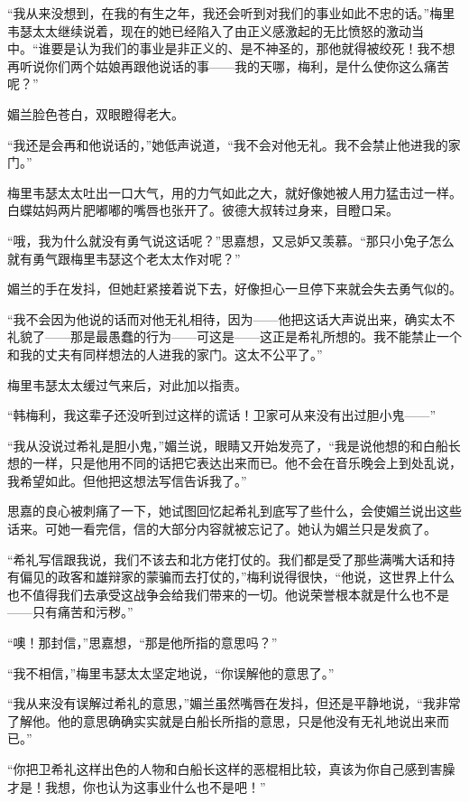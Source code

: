 \par “我从来没想到，在我的有生之年，我还会听到对我们的事业如此不忠的话。”梅里韦瑟太太继续说着，现在的她已经陷入了由正义感激起的无比愤怒的激动当中。“谁要是认为我们的事业是非正义的、是不神圣的，那他就得被绞死！我不想再听说你们两个姑娘再跟他说话的事——我的天哪，梅利，是什么使你这么痛苦呢？”
\par 媚兰脸色苍白，双眼瞪得老大。
\par “我还是会再和他说话的，”她低声说道，“我不会对他无礼。我不会禁止他进我的家门。”
\par 梅里韦瑟太太吐出一口大气，用的力气如此之大，就好像她被人用力猛击过一样。白蝶姑妈两片肥嘟嘟的嘴唇也张开了。彼德大叔转过身来，目瞪口呆。
\par “哦，我为什么就没有勇气说这话呢？”思嘉想，又忌妒又羡慕。“那只小兔子怎么就有勇气跟梅里韦瑟这个老太太作对呢？”
\par 媚兰的手在发抖，但她赶紧接着说下去，好像担心一旦停下来就会失去勇气似的。
\par “我不会因为他说的话而对他无礼相待，因为——他把这话大声说出来，确实太不礼貌了——那是最愚蠢的行为——可这是——这正是希礼所想的。我不能禁止一个和我的丈夫有同样想法的人进我的家门。这太不公平了。”
\par 梅里韦瑟太太缓过气来后，对此加以指责。
\par “韩梅利，我这辈子还没听到过这样的谎话！卫家可从来没有出过胆小鬼——”
\par “我从没说过希礼是胆小鬼，”媚兰说，眼睛又开始发亮了，“我是说他想的和白船长想的一样，只是他用不同的话把它表达出来而已。他不会在音乐晚会上到处乱说，我希望如此。但他把这想法写信告诉我了。”
\par 思嘉的良心被刺痛了一下，她试图回忆起希礼到底写了些什么，会使媚兰说出这些话来。可她一看完信，信的大部分内容就被忘记了。她认为媚兰只是发疯了。
\par “希礼写信跟我说，我们不该去和北方佬打仗的。我们都是受了那些满嘴大话和持有偏见的政客和雄辩家的蒙骗而去打仗的，”梅利说得很快，“他说，这世界上什么也不值得我们去承受这战争会给我们带来的一切。他说荣誉根本就是什么也不是——只有痛苦和污秽。”
\par “噢！那封信，”思嘉想，“那是他所指的意思吗？”
\par “我不相信，”梅里韦瑟太太坚定地说，“你误解他的意思了。”
\par “我从来没有误解过希礼的意思，”媚兰虽然嘴唇在发抖，但还是平静地说，“我非常了解他。他的意思确确实实就是白船长所指的意思，只是他没有无礼地说出来而已。”
\par “你把卫希礼这样出色的人物和白船长这样的恶棍相比较，真该为你自己感到害臊才是！我想，你也认为这事业什么也不是吧！”
